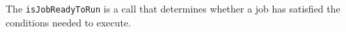 The \verb+isJobReadyToRun+ is a call that determines whether a job has satisfied the conditions needed to execute.

